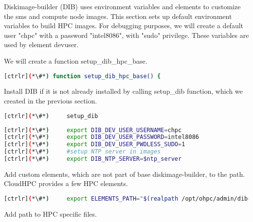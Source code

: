 
	Diskimage-builder (DIB) uses environment variables and elements to customize the sms and compute node images. This section sets up default environment variables to build HPC images. For debugging purposes, we will create a default user "chpc" with a password "intel8086", with "sudo" privilege. These variables are used by element devuser. 

	We will create a function setup\_dib\_hpc\_base.

\begin{lstlisting}[language=bash,keywords={}]
[ctrlr](*\#*) function setup_dib_hpc_base() {
\end{lstlisting}

	Install DIB if it is not already installed by calling setup\_dib function, which we created in the previous section.

\begin{lstlisting}[language=bash,keywords={}]
[ctrlr](*\#*)     setup_dib
\end{lstlisting}

\begin{lstlisting}[language=bash,keywords={}]
[ctrlr](*\#*)     export DIB_DEV_USER_USERNAME=chpc
[ctrlr](*\#*)     export DIB_DEV_USER_PASSWORD=intel8086
[ctrlr](*\#*)     export DIB_DEV_USER_PWDLESS_SUDO=1
[ctrlr](*\#*)     #setup NTP server in images
[ctrlr](*\#*)     export DIB_NTP_SERVER=$ntp_server
\end{lstlisting}

	Add custom elements, which are not part of base diskimage-builder, to the path. CloudHPC provides a few HPC elements. 

\begin{lstlisting}[language=bash,keywords={}]
[ctrlr](*\#*)     export ELEMENTS_PATH="$(realpath /opt/ohpc/admin/dib-chpc/elements/)"
\end{lstlisting}

	Add path to HPC specific files.


